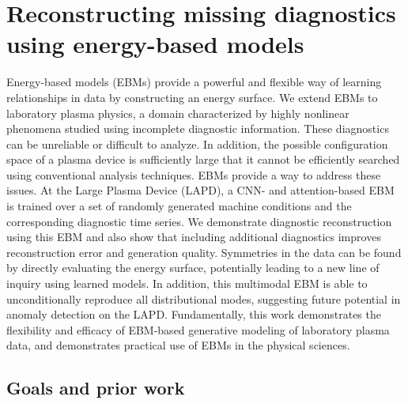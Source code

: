 \graphicspath{{Chapters/Chapter_ebm/}}


\chapter{Reconstructing missing diagnostics using energy-based models}
\label{ch:ebm}

 Energy-based models (EBMs) provide a powerful and flexible way of learning relationships in data by constructing an energy surface. We extend EBMs to laboratory plasma physics, a domain characterized by highly nonlinear phenomena studied using incomplete diagnostic information. These diagnostics can be unreliable or difficult to analyze. In addition, the possible configuration space of a plasma device is sufficiently large that it cannot be efficiently searched using conventional analysis techniques. EBMs provide a way to address these issues. At the Large Plasma Device (LAPD), a CNN- and attention-based EBM is trained over a set of randomly generated machine conditions and the corresponding diagnostic time series. We demonstrate diagnostic reconstruction using this EBM and also show that including additional diagnostics improves reconstruction error and generation quality.
  Symmetries in the data can be found by directly evaluating the energy surface, potentially leading to a new line of inquiry using learned models. In addition, this multimodal EBM is able to unconditionally reproduce all distributional modes, suggesting future potential in anomaly detection on the LAPD. Fundamentally, this work demonstrates the flexibility and efficacy of EBM-based generative modeling of laboratory plasma data, and demonstrates practical use of EBMs in the physical sciences.



\section{Goals and prior work}

